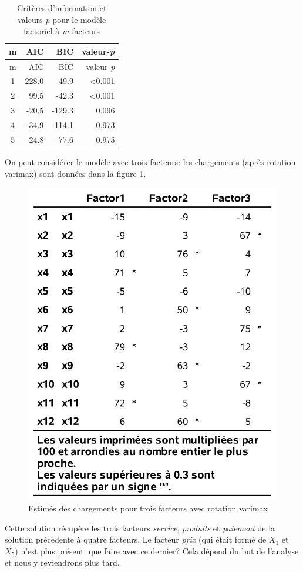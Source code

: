 \documentclass[
  11pt,
  letterpaper,
]{book}
\theoremstyle{definition}
\theoremstyle{definition}
\theoremstyle{definition}
\theoremstyle{definition}
\theoremstyle{remark}
\begin{document}
\begin{longtable}[]{@{}crrr@{}}
\caption{\label{tab:ICtable} Critères d'information et valeurs-\emph{p} pour le modèle factoriel à \emph{m} facteurs}\tabularnewline
\toprule
m & AIC & BIC & valeur-\emph{p} \\
\midrule
\endfirsthead
\toprule
m & AIC & BIC & valeur-\emph{p} \\
\midrule
\endhead
1 & 228.0 & 49.9 & \textless0.001 \\
2 & 99.5 & -42.3 & \textless0.001 \\
3 & -20.5 & -129.3 & 0.096 \\
4 & -34.9 & -114.1 & 0.973 \\
5 & -24.8 & -77.6 & 0.975 \\
\bottomrule
\end{longtable}

On peut considérer le modèle avec trois facteurs: les chargements (après rotation varimax) sont données dans la figure \ref{fig:fig1p5}.

\begin{figure}

{\centering \includegraphics[width=0.55\linewidth]{figures/01-facto-e5} 

}

\caption{Estimés des chargements pour trois facteurs avec rotation varimax}\label{fig:fig1p5}
\end{figure}

Cette solution récupère les trois facteurs \emph{service}, \emph{produits} et \emph{paiement} de la solution précédente à quatre facteurs. Le facteur \emph{prix} (qui était formé de \(X_1\) et \(X_5\)) n'est plus présent: que faire avec ce dernier? Cela dépend du but de l'analyse et nous y reviendrons plus tard.
\end{document}
